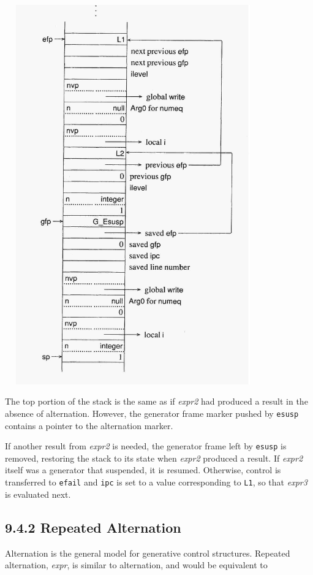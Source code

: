 \ \  \includegraphics[width=4.0602in,height=6.4457in]{ib-img/ib-img071.jpg} 


The top portion of the stack is the same as if \textit{expr2 }had
produced a result in the absence of alternation.  However, the
generator frame marker pushed by \texttt{esusp} contains a pointer to
the alternation marker.

If another result from \textit{expr2} is needed, the generator frame
left by \texttt{esusp} is removed, restoring the stack to its state
when \textit{expr2} produced a result. If \textit{expr2} itself was a
generator that suspended, it is resumed. Otherwise, control is
transferred to \texttt{efail} and \texttt{ipc} is set to a value
corresponding to \texttt{L1}, so that \textit{expr3} is evaluated next.

\subsection[9.4.2 Repeated Alternation]{9.4.2 Repeated Alternation}

Alternation is the general model for generative control
structures. Repeated alternation, \texttt{{\textbar}}\textit{expr}, is
similar to alternation, and would be equivalent to

